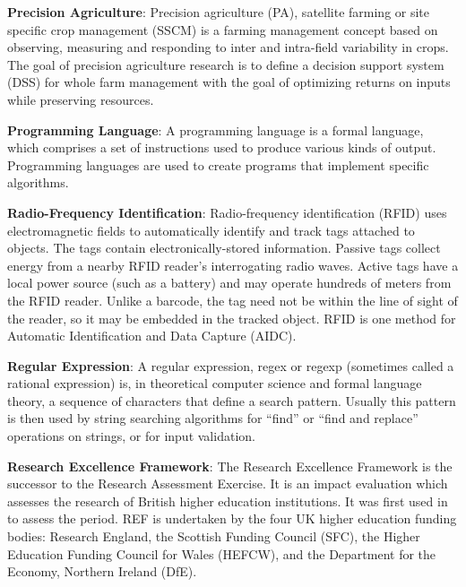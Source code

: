 \documentclass[]{book}
\theoremstyle{definition}
\theoremstyle{definition}
\theoremstyle{definition}
\theoremstyle{remark}
\begin{document}
\textbf{Precision Agriculture}: Precision agriculture (PA), satellite
farming or site specific crop management (SSCM) is a farming management
concept based on observing, measuring and responding to inter and
intra-field variability in crops. The goal of precision agriculture
research is to define a decision support system (DSS) for whole farm
management with the goal of optimizing returns on inputs while
preserving resources.

\textbf{Programming Language}: A programming language is a formal
language, which comprises a set of instructions used to produce various
kinds of output. Programming languages are used to create programs that
implement specific algorithms.

\textbf{Radio-Frequency Identification}: Radio-frequency identification
(RFID) uses electromagnetic fields to automatically identify and track
tags attached to objects. The tags contain electronically-stored
information. Passive tags collect energy from a nearby RFID reader's
interrogating radio waves. Active tags have a local power source (such
as a battery) and may operate hundreds of meters from the RFID reader.
Unlike a barcode, the tag need not be within the line of sight of the
reader, so it may be embedded in the tracked object. RFID is one method
for Automatic Identification and Data Capture (AIDC).

\textbf{Regular Expression}: A regular expression, regex or regexp
(sometimes called a rational expression) is, in theoretical computer
science and formal language theory, a sequence of characters that define
a search pattern. Usually this pattern is then used by string searching
algorithms for ``find'' or ``find and replace'' operations on strings,
or for input validation.

\textbf{Research Excellence Framework}: The Research Excellence
Framework is the successor to the Research Assessment Exercise. It is an
impact evaluation which assesses the research of British higher
education institutions. It was first used in to assess the period. REF
is undertaken by the four UK higher education funding bodies: Research
England, the Scottish Funding Council (SFC), the Higher Education
Funding Council for Wales (HEFCW), and the Department for the Economy,
Northern Ireland (DfE).
\end{document}
